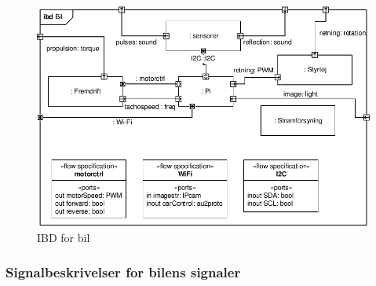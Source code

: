 \begin{figure}[h]
\centering
\includegraphics[scale=1]{../fig/diagrammer/bil/ibd_bil.pdf}
\caption{IBD for bil}
\label{fig:ibd_bil}
\end{figure}

\clearpage
\subsubsection{Signalbeskrivelser for bilens signaler}


